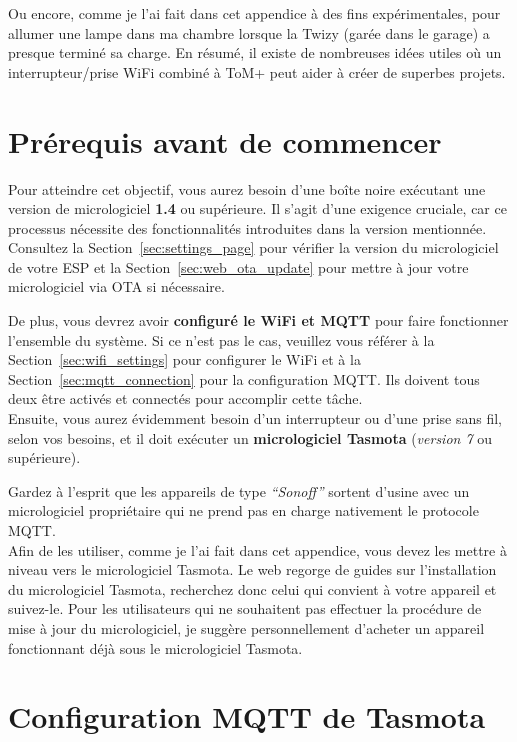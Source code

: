 Ou encore, comme je l'ai fait dans cet appendice à des fins expérimentales, pour allumer une lampe dans ma
chambre lorsque la Twizy (garée dans le garage) a presque terminé sa charge.
En résumé, il existe de nombreuses idées utiles où un interrupteur/prise WiFi combiné à
ToM+ peut aider à créer de superbes projets.


\section{Prérequis avant de commencer}

Pour atteindre cet objectif, vous aurez besoin d'une boîte noire exécutant une version de micrologiciel \textbf{1.4}
ou supérieure. Il s'agit d'une exigence cruciale, car ce processus nécessite des
fonctionnalités introduites dans la version mentionnée. Consultez la Section~\ref{sec:settings_page}
pour vérifier la version du micrologiciel de votre ESP et la Section~\ref{sec:web_ota_update} pour mettre à
jour votre micrologiciel via OTA si nécessaire.

De plus, vous devrez avoir \textbf{configuré le WiFi et MQTT} pour faire fonctionner
l'ensemble du système. Si ce n'est pas le cas, veuillez vous référer à la Section~\ref{sec:wifi_settings} pour configurer le WiFi et à la
Section~\ref{sec:mqtt_connection} pour la configuration MQTT. Ils doivent tous deux être
activés et connectés pour accomplir cette tâche.\\

Ensuite, vous aurez évidemment besoin d'un interrupteur ou d'une prise sans fil, selon vos besoins, et
il doit exécuter un \textbf{micrologiciel Tasmota} (\textit{version 7} ou supérieure).

Gardez à l'esprit que les appareils de type \textit{“Sonoff”} sortent d'usine avec un micrologiciel
propriétaire qui ne prend pas en charge nativement le protocole MQTT.\\

Afin de les utiliser, comme je l'ai fait dans cet appendice, vous devez les mettre à niveau vers le micrologiciel Tasmota.
Le web regorge de guides sur l'installation du micrologiciel Tasmota, recherchez donc celui qui
convient à votre appareil et suivez-le.
Pour les utilisateurs qui ne souhaitent pas effectuer la procédure de mise à jour du micrologiciel, je suggère personnellement
d'acheter un appareil fonctionnant déjà sous le micrologiciel Tasmota.


\section{Configuration MQTT de Tasmota}

